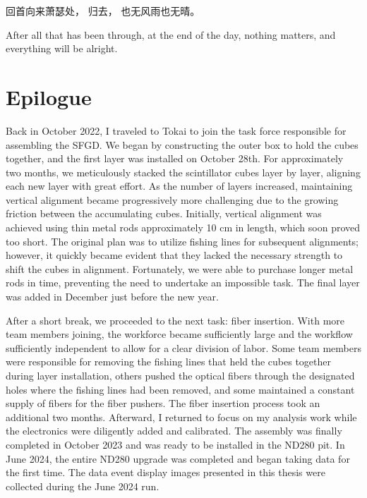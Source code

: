\begin{savequote}[8cm]
\begin{CJK*}{UTF8}{gbsn}
回首向来萧瑟处，
归去，
也无风雨也无晴。
\end{CJK*}

After all that has been through, at the end of the day, nothing matters, and everything will be alright.

\end{savequote}

\chapter{\label{ch:concl}Epilogue} 

\minitoc

Back in October 2022, I traveled to Tokai to join the task force responsible for assembling the SFGD.
We began by constructing the outer box to hold the cubes together, and the first layer was installed on October 28th.
For approximately two months, we meticulously stacked the scintillator cubes layer by layer, aligning each new layer with great effort.
As the number of layers increased, maintaining vertical alignment became progressively more challenging due to the growing friction between the accumulating cubes.
Initially, vertical alignment was achieved using thin metal rods approximately 10 cm in length, which soon proved too short.
The original plan was to utilize fishing lines for subsequent alignments; however, it quickly became evident that they lacked the necessary strength to shift the cubes in alignment.
Fortunately, we were able to purchase longer metal rods in time, preventing the need to undertake an impossible task.
The final layer was added in December just before the new year.

After a short break, we proceeded to the next task: fiber insertion.
With more team members joining, the workforce became sufficiently large and the workflow sufficiently independent to allow for a clear division of labor.
Some team members were responsible for removing the fishing lines that held the cubes together during layer installation, others pushed the optical fibers through the designated holes where the fishing lines had been removed, and some maintained a constant supply of fibers for the fiber pushers.
The fiber insertion process took an additional two months.
Afterward, I returned to focus on my analysis work while the electronics were diligently added and calibrated.
The assembly was finally completed in October 2023 and was ready to be installed in the ND280 pit.
In June 2024, the entire ND280 upgrade was completed and began taking data for the first time.
The data event display images presented in this thesis were collected during the June 2024 run.

